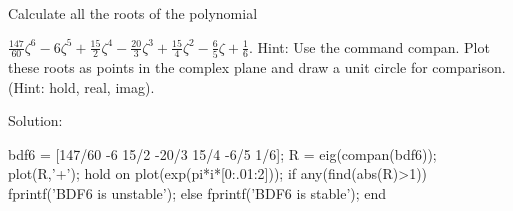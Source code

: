 Calculate all the roots of the polynomial

$\displaystyle \frac{147}{60}\zeta^6 -6\zeta^5 + \frac{15}{2}\zeta^4
- \frac{20}{3}\zeta^3 + \frac{15}{4}\zeta^2 - \frac{6}{5}\zeta +
\frac{1}{6} .
$
Hint: Use the command compan.
Plot these roots as points in the complex plane and draw a unit circle for comparison. (Hint: hold, real, imag).

Solution:

  bdf6 = [147/60 -6 15/2 -20/3 15/4 -6/5 1/6];
  R = eig(compan(bdf6));
  plot(R,'+'); hold on
  plot(exp(pi*i*[0:.01:2]));
  if any(find(abs(R)>1))
    fprintf('BDF6 is unstable\n');
  else
    fprintf('BDF6 is stable\n');
  end
